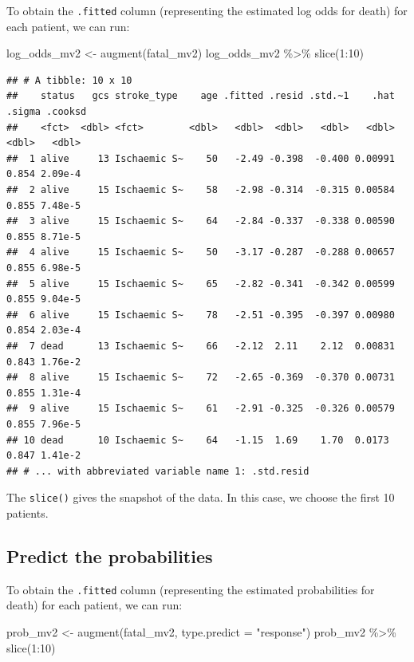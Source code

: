 \documentclass[
  10pt,
]{krantz}
\newenvironment{Shaded}{\begin{snugshade}}{\end{snugshade}}
\newcommand{\AttributeTok}[1]{\textcolor[rgb]{0.77,0.63,0.00}{#1}}
\newcommand{\DecValTok}[1]{\textcolor[rgb]{0.00,0.00,0.81}{#1}}
\newcommand{\FunctionTok}[1]{\textcolor[rgb]{0.00,0.00,0.00}{#1}}
\newcommand{\NormalTok}[1]{#1}
\newcommand{\OtherTok}[1]{\textcolor[rgb]{0.56,0.35,0.01}{#1}}
\newcommand{\SpecialCharTok}[1]{\textcolor[rgb]{0.00,0.00,0.00}{#1}}
\newcommand{\StringTok}[1]{\textcolor[rgb]{0.31,0.60,0.02}{#1}}
\begin{document}
To obtain the \texttt{.fitted} column (representing the estimated log odds for death) for each patient, we can run:

\begin{Shaded}
\begin{Highlighting}[]
\NormalTok{log\_odds\_mv2 }\OtherTok{\textless{}{-}} \FunctionTok{augment}\NormalTok{(fatal\_mv2)}
\NormalTok{log\_odds\_mv2 }\SpecialCharTok{\%\textgreater{}\%}
  \FunctionTok{slice}\NormalTok{(}\DecValTok{1}\SpecialCharTok{:}\DecValTok{10}\NormalTok{)}
\end{Highlighting}
\end{Shaded}

\begin{verbatim}
## # A tibble: 10 x 10
##    status   gcs stroke_type    age .fitted .resid .std.~1    .hat .sigma .cooksd
##    <fct>  <dbl> <fct>        <dbl>   <dbl>  <dbl>   <dbl>   <dbl>  <dbl>   <dbl>
##  1 alive     13 Ischaemic S~    50   -2.49 -0.398  -0.400 0.00991  0.854 2.09e-4
##  2 alive     15 Ischaemic S~    58   -2.98 -0.314  -0.315 0.00584  0.855 7.48e-5
##  3 alive     15 Ischaemic S~    64   -2.84 -0.337  -0.338 0.00590  0.855 8.71e-5
##  4 alive     15 Ischaemic S~    50   -3.17 -0.287  -0.288 0.00657  0.855 6.98e-5
##  5 alive     15 Ischaemic S~    65   -2.82 -0.341  -0.342 0.00599  0.855 9.04e-5
##  6 alive     15 Ischaemic S~    78   -2.51 -0.395  -0.397 0.00980  0.854 2.03e-4
##  7 dead      13 Ischaemic S~    66   -2.12  2.11    2.12  0.00831  0.843 1.76e-2
##  8 alive     15 Ischaemic S~    72   -2.65 -0.369  -0.370 0.00731  0.855 1.31e-4
##  9 alive     15 Ischaemic S~    61   -2.91 -0.325  -0.326 0.00579  0.855 7.96e-5
## 10 dead      10 Ischaemic S~    64   -1.15  1.69    1.70  0.0173   0.847 1.41e-2
## # ... with abbreviated variable name 1: .std.resid
\end{verbatim}

The \texttt{slice()} gives the snapshot of the data. In this case, we choose the first 10 patients.

\hypertarget{predict-the-probabilities}{%
\subsection{Predict the probabilities}\label{predict-the-probabilities}}

To obtain the \texttt{.fitted} column (representing the estimated probabilities for death) for each patient, we can run:

\begin{Shaded}
\begin{Highlighting}[]
\NormalTok{prob\_mv2 }\OtherTok{\textless{}{-}} 
  \FunctionTok{augment}\NormalTok{(fatal\_mv2, }
          \AttributeTok{type.predict =} \StringTok{"response"}\NormalTok{)}
\NormalTok{prob\_mv2 }\SpecialCharTok{\%\textgreater{}\%}
  \FunctionTok{slice}\NormalTok{(}\DecValTok{1}\SpecialCharTok{:}\DecValTok{10}\NormalTok{)}
\end{Highlighting}
\end{Shaded}
\end{document}
